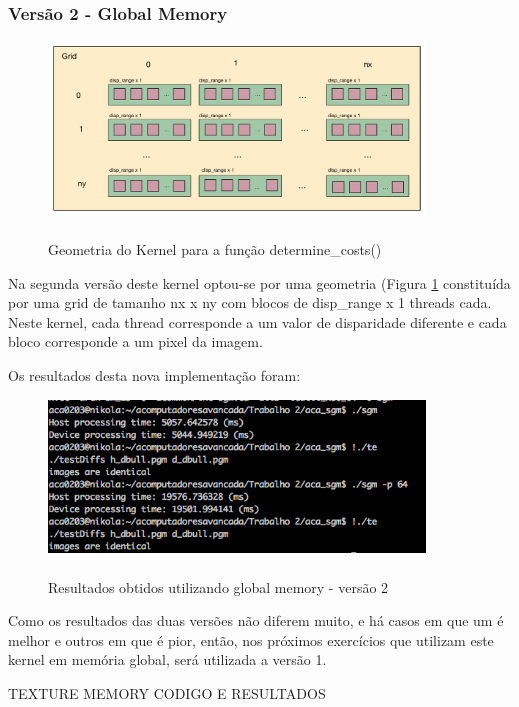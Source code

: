 \documentclass[pdftex,12pt,a4paper]{report}
\begin{document}
\subsubsection{Versão 2 - Global Memory}

\begin{figure}[!htb]
\center
 \includegraphics[width=100mm,scale=1]{DetermineCosts_v2_kernel.pdf}
 \caption{\\ Geometria do Kernel para a função determine\_costs()}
 \label{fig:DetermineCosts_v2_kernel}
\end{figure}

Na segunda versão deste kernel optou-se por uma geometria (Figura \ref{fig:DetermineCosts_v2_kernel}  constituída por uma grid de tamanho nx x ny com blocos de disp\_range x 1 threads cada.
Neste kernel, cada thread corresponde a um valor de disparidade diferente e cada bloco corresponde a um pixel da imagem.

Os resultados desta nova implementação foram:

\begin{figure}[!htb]
\center
 \includegraphics[width=100mm,scale=1]{DetermineCostsv2.png}
 \caption{\\ Resultados obtidos utilizando global memory - versão 2}
 \label{fig:DetermineCostsv2}
\end{figure}

Como os resultados das duas versões não diferem muito, e há casos em que um é melhor e outros em que é pior, então, nos próximos exercícios que utilizam este kernel em memória global, será utilizada a versão 1.


TEXTURE MEMORY CODIGO E RESULTADOS
\end{document}

